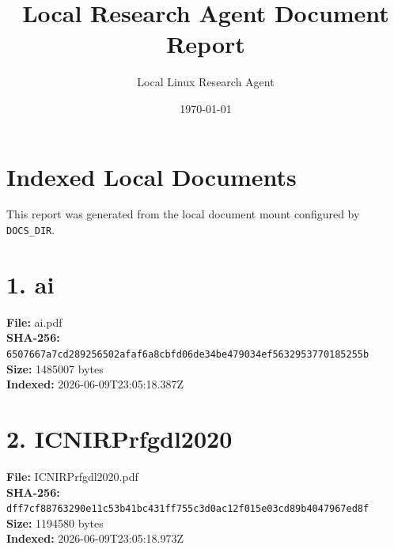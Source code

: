 \documentclass[11pt,a4paper]{article}
\title{Local Research Agent Document Report}
\author{Local Linux Research Agent}
\date{\today}
\begin{document}
\maketitle

\section*{Indexed Local Documents}
This report was generated from the local document mount configured by \texttt{DOCS\_DIR}.

\section*{1. ai}
\textbf{File:} ai.pdf\\
\textbf{SHA-256:} \texttt{6507667a7cd289256502afaf6a8cbfd06de34be479034ef5632953770185255b}\\
\textbf{Size:} 1485007 bytes\\
\textbf{Indexed:} 2026-06-09T23:05:18.387Z

\section*{2. ICNIRPrfgdl2020}
\textbf{File:} ICNIRPrfgdl2020.pdf\\
\textbf{SHA-256:} \texttt{dff7cf88763290e11c53b41bc431ff755c3d0ac12f015e03cd89b4047967ed8f}\\
\textbf{Size:} 1194580 bytes\\
\textbf{Indexed:} 2026-06-09T23:05:18.973Z
\end{document}

